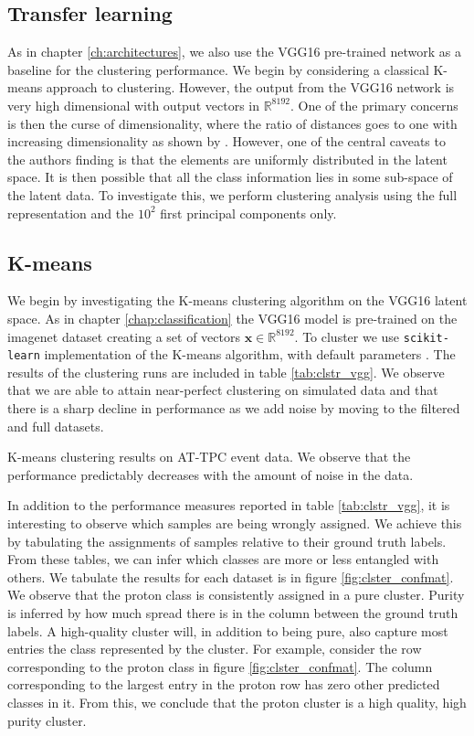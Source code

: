 \documentclass[preprint,12pt]{elsarticle}
\newcommand{\R}{\mathbb{R}}
\begin{document}
\subsection{Transfer learning}
As in chapter \ref{ch:architectures}, we also use the VGG16 pre-trained network as a baseline for the clustering performance. We begin by considering a classical K-means approach to clustering. However, the output from the VGG16 network is very high dimensional with output vectors in $\R^{8192}$.  One of the primary concerns is then the curse of dimensionality, where the ratio of distances goes to one with increasing dimensionality as shown by \citet{Aggarwal}. However, one of the central caveats to the authors  finding is that the elements are uniformly distributed in the latent space. It is then possible that all the class information lies in some sub-space of the latent data. To investigate this, we perform clustering analysis using the full representation and the $10^2$ first principal components only. 

\subsection{K-means}

We begin by investigating the K-means clustering algorithm on the VGG16 latent space. As in chapter \ref{chap:classification} the VGG16 model is pre-trained on the imagenet dataset creating a set of vectors $\boldsymbol{x} \in \R^{8192}$. To cluster we use \lstinline{scikit-learn} implementation of the K-means algorithm, with default parameters \cite{Pedregosa2011}. The results of the clustering runs are included in table \ref{tab:clstr_vgg}. We observe that we are able to attain near-perfect clustering on simulated data and that there is a sharp decline in performance as we add noise by moving to the filtered and full datasets. 

\begin{table}[H]
\centering 
\caption[K-means on pre-trained model]{K-means clustering results on AT-TPC event data. We observe that the performance predictably decreases with the amount of noise in the data.}\label{tab:clstr_vgg}

\end{table}

In addition to the performance measures reported in table \ref{tab:clstr_vgg}, it is interesting to observe which samples are being wrongly assigned. We achieve this by tabulating the assignments of samples relative to their ground truth labels. From these tables, we can infer which classes are more or less entangled with others. We tabulate the results for each dataset is in figure \ref{fig:clster_confmat}. We observe that the proton class is consistently assigned in a pure cluster. Purity is inferred by how much spread there is in the column between the ground truth labels. A high-quality cluster will, in addition to being pure, also capture most entries the class represented by the cluster. For example, consider the row corresponding to the proton class in figure \ref{fig:clster_confmat}. The column corresponding to the largest entry in the proton row has zero other predicted classes in it. From this, we conclude that the proton cluster is a high quality, high purity cluster. 
\end{document}
